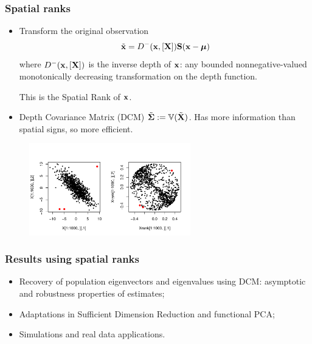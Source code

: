 \documentclass[handout,10pt]{beamer}
\begin{document}
\begin{frame}
\frametitle{Spatial ranks}

\begin{itemize}
\item Transform the original observation
%
$$
\tilde {{\bf{x}}} = D^- ({\bf{x}}, [{\mathbf{X}}] ) {\mathbf{S}}({\bf{x}} - {\boldsymbol{\mu}})
$$
%
where $D^- ({\bf{x}}, [{\mathbf{X}}])$ is the {\colbit inverse depth} of ${\bf{x}}$: any bounded nonnegative-valued monotonically decreasing transformation on the depth function.

\vspace{1em}
This is the {\colbit Spatial Rank} of ${\bf{x}}$.

\vspace{1em}
\item Depth Covariance Matrix (DCM) $\tilde {{\boldsymbol{\Sigma}}} := {\mathbb{V}} (\tilde {{\mathbf{X}}}) $. Has more information than spatial signs, so more efficient.
\end{itemize}

\begin{figure}\begin{center}
   \includegraphics[height=4cm]{ranks}
   \label{fig:fig3}
\end{center}\end{figure}
\end{frame}



\begin{frame}
\frametitle{Results using spatial ranks}
\begin{itemize}
\item Recovery of population eigenvectors and eigenvalues using DCM: asymptotic and robustness properties of estimates;
\vspace{.2cm}

\item Adaptations in Sufficient Dimension Reduction and functional PCA;

\vspace{.2cm}

\item Simulations and real data applications.
\end{itemize}
\end{frame}
\end{document}
